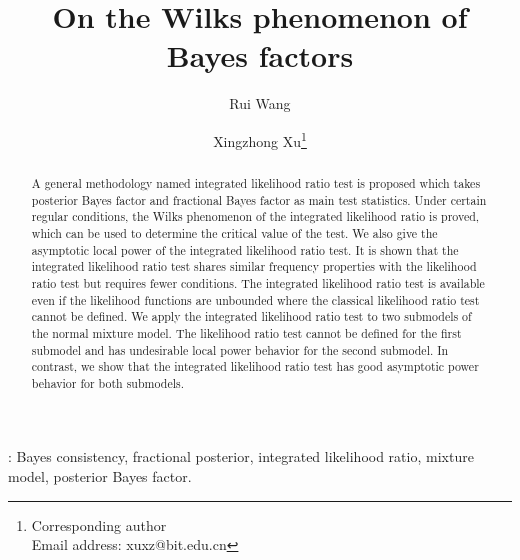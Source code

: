 \documentclass[11pt]{article}
\theoremstyle{plain}
\theoremstyle{definition}
\theoremstyle{remark}
\begin{document}
\title{On the Wilks phenomenon of Bayes factors}
\author[1]{Rui Wang}
\author[1,2]{Xingzhong Xu\thanks{Corresponding author\\Email address: xuxz@bit.edu.cn}}

\maketitle


\begin{abstract}
    A general methodology named integrated likelihood ratio test is proposed which takes posterior Bayes factor and fractional Bayes factor as main test statistics.
    Under certain regular conditions, the Wilks phenomenon of the integrated likelihood ratio is proved, which can be used to determine the critical value of the test.
    We also give the asymptotic local power of the integrated likelihood ratio test.
    It is shown that the integrated likelihood ratio test shares similar frequency properties with the likelihood ratio test but requires fewer conditions.
    The integrated likelihood ratio test is available even if the likelihood functions are unbounded where the classical likelihood ratio test cannot be defined.
    We apply the integrated likelihood ratio test to two submodels of the normal mixture model.
    The likelihood ratio test cannot be defined for the first submodel and has undesirable local power behavior for the second submodel.
    In contrast, we show that the integrated likelihood ratio test has good asymptotic power behavior for both submodels.
\end{abstract}

:
Bayes consistency,
fractional posterior,
integrated likelihood ratio,
mixture model,
posterior Bayes factor.
\end{document}
